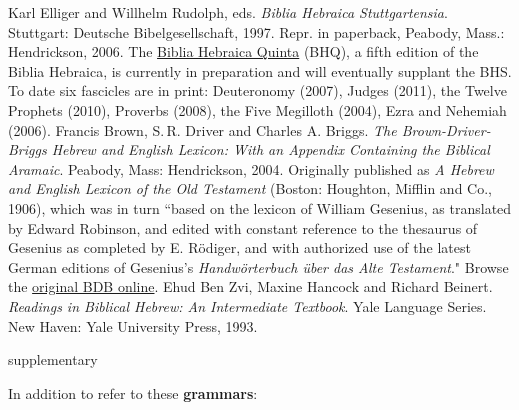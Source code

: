 \documentclass[titlepage]{article}
\begin{document}
\begingroup
\renewcommand{\section}[2]{}%
\begin{thebibliography}{Ben Zvi}%
    Karl Elliger and Willhelm Rudolph, eds. \emph{Biblia Hebraica
    Stuttgartensia}. Stutt\-gart: Deut\-sche Bi\-bel\-ge\-sell\-schaft,
    1997. Repr. in paperback, Peabody, Mass.: Hendrickson, 2006. The
    \href{http://www.academic-bible.com/en/home/current-projects/biblia-hebraica-quinta-bhq/}%
    {Biblia Hebraica Quinta} (BHQ), a fifth edition of the Biblia
    Hebraica, is currently in preparation and will eventually supplant
    the BHS. To date six fascicles are in print:
        Deuteronomy (2007),
        Judges (2011),
        the Twelve Prophets (2010),
        Proverbs (2008),
        the Five Megilloth (2004),
        Ezra and Nehemiah (2006).
    Francis Brown, S.\,R. Driver and Charles A. Briggs. \emph{The
    Brown-Driver-Briggs Hebrew and English Lexicon: With an Appendix
    Containing the Biblical Aramaic}. Peabody, Mass: Hendrickson, 2004.
    Originally published as \emph{A Hebrew and English Lexicon of the
    Old Testament} (Boston: Houghton, Mifflin and Co., 1906), which was
    in turn ``based on the lexicon of William Gesenius, as translated by
    Edward Robinson, and edited with constant reference to the thesaurus
    of Gesenius as completed by E. Rödiger, and with authorized use of
    the latest German editions of Gesenius's \emph{Handwörterbuch über
    das Alte Testament}." Browse the
    \href{https://archive.org/details/hebrewenglishlex00geseuoft}{original BDB online}.
    Ehud Ben Zvi, Maxine Hancock and Richard Beinert. \emph{Readings in
    Biblical Hebrew: An Intermediate Textbook}. Yale Language Series.
    New Haven: Yale University Press, 1993.
\end{thebibliography}
\endgroup

\section{Supplementary Texts}
\label{supplementary}

In addition to \cite{bz} refer to these \textbf{grammars}:
\end{document}
